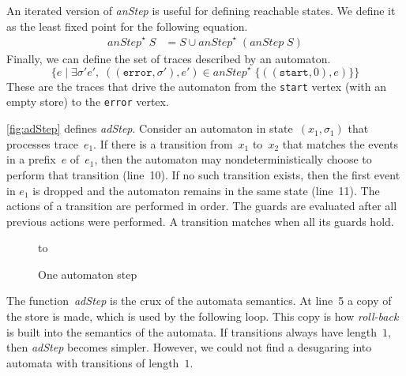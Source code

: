 \documentclass[preprint]{sigplanconf} %
\theoremstyle{definition}
\begin{document}
An iterated version of \textit{anStep} is useful for defining reachable states.
We define it as the least fixed point for the following equation.
\begin{align}
\mathit{anStep}^\star\;S &= S \cup \mathit{anStep}^\star\;(\mathit{anStep}\;S)
\end{align}
Finally, we can define the set of traces described by an automaton.
\[ \{ e \mid \exists\sigma'e',\;((\mathtt{error},\sigma'),e')\in\mathit{anStep}^\star\;\{((\mathtt{start},0),e)\}\} \]
These are the traces that drive the automaton from the \texttt{start} vertex (with an empty store) to the \texttt{error} vertex.

\autoref{fig:adStep} defines \textit{adStep}.
Consider an automaton in state~$(x_1,\sigma_1)$ that processes trace~$e_1$.
If there is a transition from~$x_1$ to~$x_2$ that matches the events in a prefix~$e$ of~$e_1$, then the automaton may nondeterministically choose to perform that transition (line~10).
If no such transition exists, then the first event in $e_1$ is dropped and the automaton remains in the same state (line~11).
The actions of a transition are performed in order.
The guards are evaluated after all previous actions were performed.
A transition matches when all its guards hold.

\begin{figure}
\hbox to
\caption{One automaton step}
\label{fig:adStep}
\end{figure}

The function~\textit{adStep} is the crux of the automata semantics.
At line~5 a copy of the store is made, which is used by the following loop.
This copy is how \emph{roll-back} is built into the semantics of the automata.
If transitions always have length~$1$, then \textit{adStep} becomes simpler.
However, we could not find a desugaring into automata with transitions of length~$1$.
\end{document}
